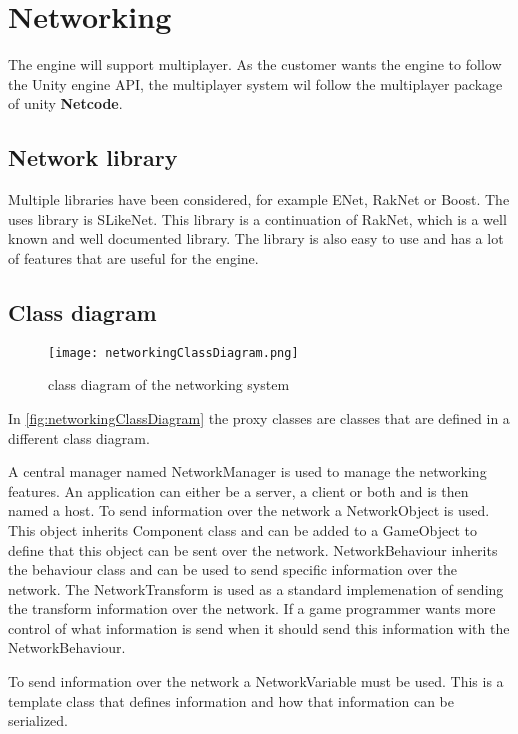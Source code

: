 \section{Networking}
\label{sec:networking}
The engine will support multiplayer.
As the customer wants the engine to follow the Unity engine API, the multiplayer system wil follow the multiplayer package of unity \textbf{Netcode}.

\subsection{Network library}
Multiple libraries have been considered, for example ENet, RakNet or Boost.
The uses library is SLikeNet. This library is a continuation of RakNet, which is a well known and well documented library.
The library is also easy to use and has a lot of features that are useful for the engine.

\subsection{Class diagram}

\begin{figure}[H]
    \centering
    \texttt{[image: networkingClassDiagram.png]}
    \caption{class diagram of the networking system}
    \label{fig:networkingClassDiagram}
\end{figure}
In \autoref{fig:networkingClassDiagram} the proxy classes are classes that are defined in a different class diagram.

A central manager named NetworkManager is used to manage the networking features.
An application can either be a server, a client or both and is then named a host.
To send information over the network a NetworkObject is used.
This object inherits Component class and can be added to a GameObject to define that this object can be sent over the network.
NetworkBehaviour inherits the behaviour class and can be used to send specific information over the network.
The NetworkTransform is used as a standard implemenation of sending the transform information over the network.
If a game programmer wants more control of what information is send when it should send this information with the NetworkBehaviour.

To send information over the network a NetworkVariable must be used.
This is a template class that defines information and how that information can be serialized.

